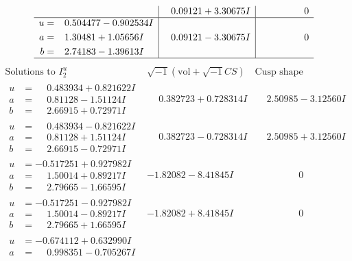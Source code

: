 \documentclass[1p]{elsarticle_modified}
\theoremstyle{definition}
\newcommand{\I}{\sqrt{-1}}
\begin{document}
$$\begin{array}{c|c|c}
 & \phantom{-}0.09121 + 3.30675 I & \phantom{-0.000000 } 0 \\ \hline\begin{aligned}
u &= \phantom{-}0.504477 - 0.902534 I \\
a &= \phantom{-}1.30481 + 1.05656 I \\
b &= \phantom{-}2.74183 - 1.39613 I\end{aligned}
 & \phantom{-}0.09121 - 3.30675 I & \phantom{-0.000000 } 0\\
 \hline 
 \end{array}$$\newpage$$\begin{array}{c|c|c}  
\text{Solutions to }I^u_{2}& \I (\text{vol} + \sqrt{-1}CS) & \text{Cusp shape}\\
 \hline 
\begin{aligned}
u &= \phantom{-}0.483934 + 0.821622 I \\
a &= \phantom{-}0.81128 - 1.51124 I \\
b &= \phantom{-}2.66915 + 0.72971 I\end{aligned}
 & \phantom{-}0.382723 + 0.728314 I & \phantom{-}2.50985 - 3.12560 I \\ \hline\begin{aligned}
u &= \phantom{-}0.483934 - 0.821622 I \\
a &= \phantom{-}0.81128 + 1.51124 I \\
b &= \phantom{-}2.66915 - 0.72971 I\end{aligned}
 & \phantom{-}0.382723 - 0.728314 I & \phantom{-}2.50985 + 3.12560 I \\ \hline\begin{aligned}
u &= -0.517251 + 0.927982 I \\
a &= \phantom{-}1.50014 + 0.89217 I \\
b &= \phantom{-}2.79665 - 1.66595 I\end{aligned}
 & -1.82082 - 8.41845 I & \phantom{-0.000000 } 0 \\ \hline\begin{aligned}
u &= -0.517251 - 0.927982 I \\
a &= \phantom{-}1.50014 - 0.89217 I \\
b &= \phantom{-}2.79665 + 1.66595 I\end{aligned}
 & -1.82082 + 8.41845 I & \phantom{-0.000000 } 0 \\ \hline\begin{aligned}
u &= -0.674112 + 0.632990 I \\
a &= \phantom{-}0.998351 - 0.705267 I \\

\end{aligned}
\end{array}$$
\end{document}
